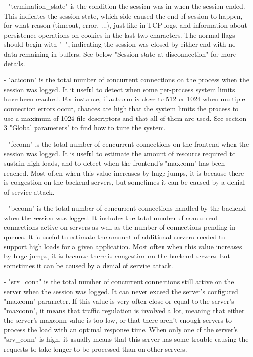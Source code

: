   - "termination_state" is the condition the session was in when the session
    ended. This indicates the session state, which side caused the end of
    session to happen, for what reason (timeout, error, ...), just like in TCP
    logs, and information about persistence operations on cookies in the last
    two characters. The normal flags should begin with "--", indicating the
    session was closed by either end with no data remaining in buffers. See
    below "Session state at disconnection" for more details.

  - "actconn" is the total number of concurrent connections on the process when
    the session was logged. It it useful to detect when some per-process system
    limits have been reached. For instance, if actconn is close to 512 or 1024
    when multiple connection errors occur, chances are high that the system
    limits the process to use a maximum of 1024 file descriptors and that all
    of them are used. See section 3 "Global parameters" to find how to tune the
    system.

  - "feconn" is the total number of concurrent connections on the frontend when
    the session was logged. It is useful to estimate the amount of resource
    required to sustain high loads, and to detect when the frontend's "maxconn"
    has been reached. Most often when this value increases by huge jumps, it is
    because there is congestion on the backend servers, but sometimes it can be
    caused by a denial of service attack.

  - "beconn" is the total number of concurrent connections handled by the
    backend when the session was logged. It includes the total number of
    concurrent connections active on servers as well as the number of
    connections pending in queues. It is useful to estimate the amount of
    additional servers needed to support high loads for a given application.
    Most often when this value increases by huge jumps, it is because there is
    congestion on the backend servers, but sometimes it can be caused by a
    denial of service attack.

  - "srv_conn" is the total number of concurrent connections still active on
    the server when the session was logged. It can never exceed the server's
    configured "maxconn" parameter. If this value is very often close or equal
    to the server's "maxconn", it means that traffic regulation is involved a
    lot, meaning that either the server's maxconn value is too low, or that
    there aren't enough servers to process the load with an optimal response
    time. When only one of the server's "srv_conn" is high, it usually means
    that this server has some trouble causing the requests to take longer to be
    processed than on other servers.

